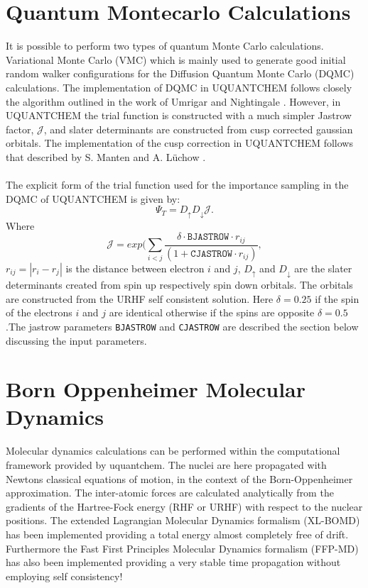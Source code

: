 \documentclass[a4paper,twoside,openany]{book}
\begin{document}
\section{Quantum Montecarlo Calculations }
It is possible to perform two types of quantum Monte Carlo calculations. Variational Monte Carlo (VMC) which is mainly used to generate good initial 
random walker configurations for the Diffusion Quantum Monte Carlo (DQMC) calculations. The implementation of DQMC in UQUANTCHEM follows 
closely the algorithm outlined in the work of Umrigar and Nightingale \cite{UMRIGAR}. However, in UQUANTCHEM the trial function is constructed 
with a much simpler Jastrow factor, $\mathcal{J}$,  and slater determinants are constructed from cusp corrected gaussian orbitals. The implementation of the cusp correction 
in UQUANTCHEM follows that described by S. Manten and A. L\"uchow \cite{CUSP}. \\ \\
\noindent
The explicit form of the trial function used for the importance sampling in the DQMC of UQUANTCHEM is given by:
\begin{equation}
\Psi_{T} = D_{\uparrow}D_{\downarrow}\mathcal{J}.
\end{equation}
Where 
\begin{equation}
\mathcal{J} = exp(\sum_{i<j}\frac{\delta\cdot\texttt{BJASTROW}\cdot r_{ij}}{(1+ \texttt{CJASTROW}\cdot r_{ij})},
\end{equation}
$r_{ij} = | r_{i} - r_{j}|$ is the distance between electron $i$ and $j$, $D_{\uparrow}$ and $D_{\downarrow}$ are the slater determinants created from spin up respectively 
spin down orbitals. The orbitals are constructed from the URHF self consistent solution. Here $\delta = 0.25$ if the spin of the electrons $i$ and $j$ are identical otherwise 
if the spins are opposite $\delta = 0.5$.The jastrow parameters \texttt{BJASTROW} and \texttt{CJASTROW} are described the section below discussing the input parameters.

\section{Born Oppenheimer Molecular Dynamics}
Molecular dynamics calculations can be performed within the computational framework provided by uquantchem. The nuclei are here propagated with Newtons classical 
equations of motion, in the context of  the Born-Oppenheimer approximation. The inter-atomic forces are calculated analytically from the gradients of the Hartree-Fock energy (RHF or URHF)
with respect to the nuclear positions. The extended Lagrangian Molecular Dynamics formalism (XL-BOMD) \cite{AMN1,AMN2,XLBOMD} has been implemented providing a total energy 
almost completely free of drift. Furthermore the Fast First Principles Molecular Dynamics formalism (FFP-MD) has also been implemented providing a very stable time propagation without 
employing self consistency!
\end{document}
